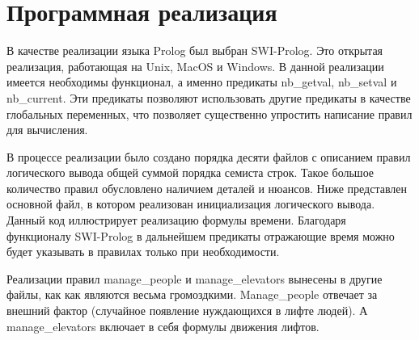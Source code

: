 \section{ Программная реализация}

	В качестве реализации языка Prolog был выбран SWI-Prolog.
		Это открытая реализация, работающая на Unix, MacOS и Windows.
		В данной реализации имеется необходимы функционал, а именно предикаты nb\_getval, nb\_setval и nb\_current.
		Эти предикаты позволяют использовать другие предикаты в качестве глобальных переменных, что
		позволяет существенно упростить написание правил для вычисления.

	В процессе реализации было создано порядка десяти файлов с описанием правил логического вывода
		общей суммой порядка семиста строк. Такое большое количество правил обусловлено наличием деталей и нюансов.
		Ниже представлен основной файл, в котором реализован инициализация логического вывода.
		Данный код иллюстрирует реализацию формулы времени. Благодаря функционалу SWI-Prolog
		в дальнейшем предикаты отражающие время можно будет указывать в правилах только при необходимости.



	Реализации правил manage\_people и manage\_elevators вынесены в другие файлы,
		как как являются весьма громоздкими.
		Manage\_people отвечает за внешний фактор (случайное появление нуждающихся в лифте людей).
		А manage\_elevators включает в себя формулы движения лифтов.
